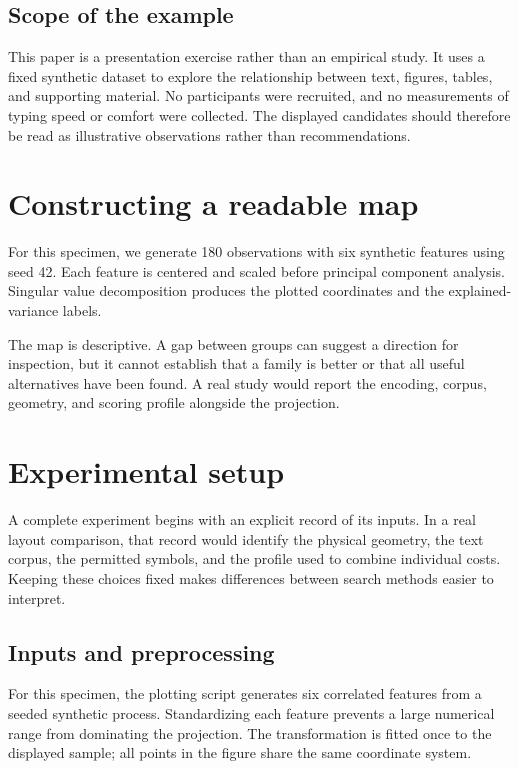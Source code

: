 \documentclass{gecko-paper}
\begin{document}
\begin{paperbody}
\subsection{Scope of the example}

This paper is a presentation exercise rather than an empirical study. It uses a fixed synthetic dataset to explore the relationship between text, figures, tables, and supporting material. No participants were recruited, and no measurements of typing speed or comfort were collected. The displayed candidates should therefore be read as illustrative observations rather than recommendations.

\section{Constructing a readable map}
For this specimen, we generate 180 observations with six synthetic features using seed 42. Each feature is centered and scaled before principal component analysis. Singular value decomposition produces the plotted coordinates and the explained-variance labels.

The map is descriptive. A gap between groups can suggest a direction for inspection, but it cannot establish that a family is better or that all useful alternatives have been found. A real study would report the encoding, corpus, geometry, and scoring profile alongside the projection.


\section{Experimental setup}

A complete experiment begins with an explicit record of its inputs. In a real layout comparison, that record would identify the physical geometry, the text corpus, the permitted symbols, and the profile used to combine individual costs. Keeping these choices fixed makes differences between search methods easier to interpret.

\subsection{Inputs and preprocessing}

For this specimen, the plotting script generates six correlated features from a seeded synthetic process. Standardizing each feature prevents a large numerical range from dominating the projection. The transformation is fitted once to the displayed sample; all points in the figure share the same coordinate system.


\end{paperbody}
\end{document}
